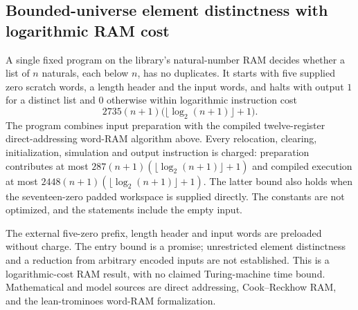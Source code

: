 \begin{result}
\subsection{Bounded-universe element distinctness with logarithmic RAM cost}
A single fixed program on the library's natural-number RAM decides whether a list of $n$
naturals, each below $n$, has no duplicates. It starts with five supplied zero scratch words,
a length header and the input words, and halts with output $1$ for a distinct list and $0$
otherwise within logarithmic instruction cost
\[
2735(n+1)\bigl(\lfloor\log_2(n+1)\rfloor+1\bigr).
\]
The program combines input preparation with the compiled twelve-register direct-addressing
word-RAM algorithm above. Every relocation, clearing, initialization, simulation and output instruction
is charged: preparation contributes at most $287(n+1)(\lfloor\log_2(n+1)\rfloor+1)$ and
compiled execution at most $2448(n+1)(\lfloor\log_2(n+1)\rfloor+1)$. The latter bound also
holds when the seventeen-zero padded workspace is supplied directly. The constants are not
optimized, and the statements include the empty input.

The external five-zero prefix, length header and input words are preloaded without charge.
The entry bound is a promise; unrestricted element distinctness and a reduction from arbitrary
encoded inputs are not established. This is a logarithmic-cost RAM result, with no claimed
Turing-machine time bound. Mathematical and model sources are direct addressing, Cook--Reckhow
RAM, and the lean-trominoes word-RAM formalization.
\citep[Section 11.1]{CLRS2009}\citep{CookReckhow1973,Tromino2025}
\end{result}


